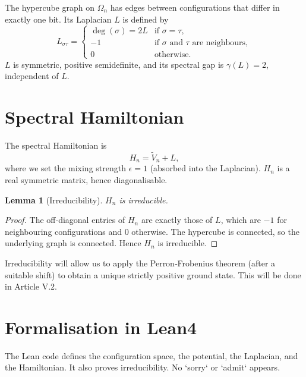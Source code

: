 \documentclass[11pt,a4paper]{article}
\newtheorem{lemma}[theorem]{Lemma}
\begin{document}
The hypercube graph on \(\Omega_n\) has edges between configurations that differ in exactly one bit. Its Laplacian \(L\) is defined by
\[
L_{\sigma\tau} = \begin{cases}
\deg(\sigma) = 2L & \text{if } \sigma=\tau,\\
-1 & \text{if } \sigma \text{ and } \tau \text{ are neighbours},\\
0 & \text{otherwise}.
\end{cases}
\]
\(L\) is symmetric, positive semidefinite, and its spectral gap is \(\gamma(L)=2\), independent of \(L\).

\section{Spectral Hamiltonian}

The spectral Hamiltonian is
\[
H_n = \tilde{V}_n + L,
\]
where we set the mixing strength \(\epsilon = 1\) (absorbed into the Laplacian). \(H_n\) is a real symmetric matrix, hence diagonalisable.

\begin{lemma}[Irreducibility]
\(H_n\) is irreducible.
\end{lemma}
\begin{proof}
The off‑diagonal entries of \(H_n\) are exactly those of \(L\), which are \(-1\) for neighbouring configurations and \(0\) otherwise. The hypercube is connected, so the underlying graph is connected. Hence \(H_n\) is irreducible.
\end{proof}

Irreducibility will allow us to apply the Perron‑Frobenius theorem (after a suitable shift) to obtain a unique strictly positive ground state. This will be done in Article V.2.

\section{Formalisation in Lean4}

The Lean code defines the configuration space, the potential, the Laplacian, and the Hamiltonian. It also proves irreducibility. No `sorry` or `admit` appears.
\end{document}

